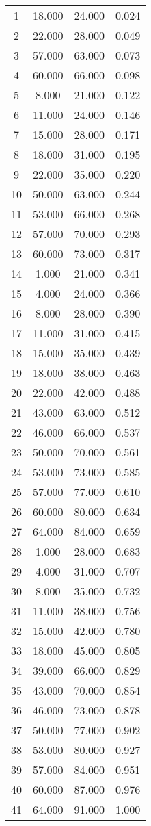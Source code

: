 % 
\begin{tabular}{cccc}
  \hline
  \hline
1 & 18.000 & 24.000 & 0.024 \\ 
  2 & 22.000 & 28.000 & 0.049 \\ 
  3 & 57.000 & 63.000 & 0.073 \\ 
  4 & 60.000 & 66.000 & 0.098 \\ 
  5 & 8.000 & 21.000 & 0.122 \\ 
  6 & 11.000 & 24.000 & 0.146 \\ 
  7 & 15.000 & 28.000 & 0.171 \\ 
  8 & 18.000 & 31.000 & 0.195 \\ 
  9 & 22.000 & 35.000 & 0.220 \\ 
  10 & 50.000 & 63.000 & 0.244 \\ 
  11 & 53.000 & 66.000 & 0.268 \\ 
  12 & 57.000 & 70.000 & 0.293 \\ 
  13 & 60.000 & 73.000 & 0.317 \\ 
  14 & 1.000 & 21.000 & 0.341 \\ 
  15 & 4.000 & 24.000 & 0.366 \\ 
  16 & 8.000 & 28.000 & 0.390 \\ 
  17 & 11.000 & 31.000 & 0.415 \\ 
  18 & 15.000 & 35.000 & 0.439 \\ 
  19 & 18.000 & 38.000 & 0.463 \\ 
  20 & 22.000 & 42.000 & 0.488 \\ 
  21 & 43.000 & 63.000 & 0.512 \\ 
  22 & 46.000 & 66.000 & 0.537 \\ 
  23 & 50.000 & 70.000 & 0.561 \\ 
  24 & 53.000 & 73.000 & 0.585 \\ 
  25 & 57.000 & 77.000 & 0.610 \\ 
  26 & 60.000 & 80.000 & 0.634 \\ 
  27 & 64.000 & 84.000 & 0.659 \\ 
  28 & 1.000 & 28.000 & 0.683 \\ 
  29 & 4.000 & 31.000 & 0.707 \\ 
  30 & 8.000 & 35.000 & 0.732 \\ 
  31 & 11.000 & 38.000 & 0.756 \\ 
  32 & 15.000 & 42.000 & 0.780 \\ 
  33 & 18.000 & 45.000 & 0.805 \\ 
  34 & 39.000 & 66.000 & 0.829 \\ 
  35 & 43.000 & 70.000 & 0.854 \\ 
  36 & 46.000 & 73.000 & 0.878 \\ 
  37 & 50.000 & 77.000 & 0.902 \\ 
  38 & 53.000 & 80.000 & 0.927 \\ 
  39 & 57.000 & 84.000 & 0.951 \\ 
  40 & 60.000 & 87.000 & 0.976 \\ 
  41 & 64.000 & 91.000 & 1.000 \\ 
   \hline
\end{tabular}
